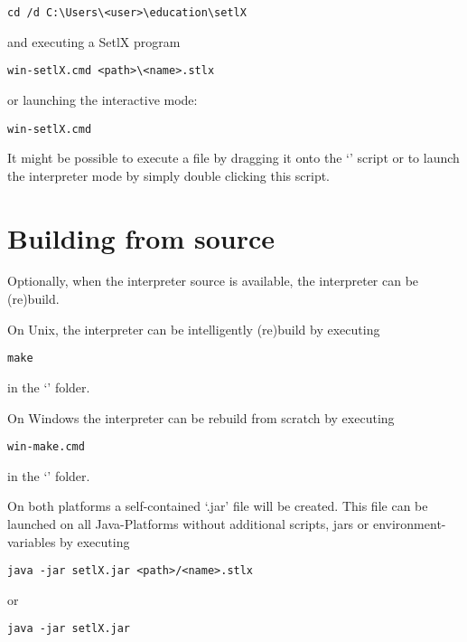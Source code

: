 \begin{lstlisting}[frame=none,numbers=none]
cd /d C:\Users\<user>\education\setlX
\end{lstlisting}

and executing a SetlX program

\begin{lstlisting}[frame=none,numbers=none]
win-setlX.cmd <path>\<name>.stlx
\end{lstlisting}

or launching the interactive mode:

\begin{lstlisting}[frame=none,numbers=none]
win-setlX.cmd
\end{lstlisting}

It might be possible to execute a \SetlX{} file by dragging it onto the `' script or to launch the interpreter mode by simply double clicking this script.

\section{Building from source}

Optionally, when the interpreter source is available, the interpreter can be (re)build.

On Unix, the interpreter can be intelligently (re)build by executing

\begin{lstlisting}[frame=none,numbers=none]
make
\end{lstlisting}

in the `' folder.

On Windows the interpreter can be rebuild from scratch by executing
\begin{lstlisting}[frame=none,numbers=none]
win-make.cmd
\end{lstlisting}

in the `' folder.

On both platforms a self-contained `.jar' file will be created. This file can be launched on all Java-Platforms without additional scripts, jars or environment-variables by executing

\begin{lstlisting}[frame=none,numbers=none]
java -jar setlX.jar <path>/<name>.stlx
\end{lstlisting}

or

\begin{lstlisting}[frame=none,numbers=none]
java -jar setlX.jar
\end{lstlisting}

